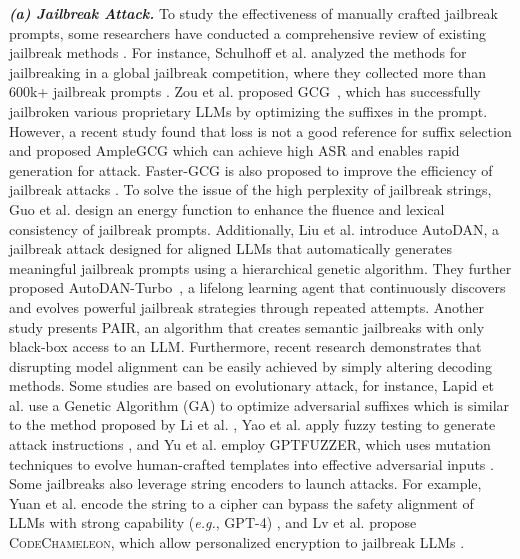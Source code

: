 \textbf{\textit{(a) Jailbreak Attack.}} To study the effectiveness of manually crafted jailbreak prompts, some researchers have conducted a comprehensive review of existing jailbreak methods \cite{schulhoff-etal-2023-ignore, yi2024jailbreakattacksdefenseslarge, sun2024iterative}. For instance, Schulhoff et al. analyzed the methods for jailbreaking in a global jailbreak competition, where they collected more than 600k+ jailbreak prompts \cite{schulhoff-etal-2023-ignore}. Zou et al. proposed GCG~\cite{zou2023universal}, which has successfully jailbroken various proprietary LLMs by optimizing the suffixes in the prompt. However, a recent study found that loss is not a good reference for suffix selection and proposed AmpleGCG \cite{liao2024amplegcglearninguniversaltransferable, kumar2024amplegcgplus} which can achieve high ASR and enables rapid generation for attack. Faster-GCG is also proposed to improve the efficiency of jailbreak attacks \cite{li2024faster}. To solve the issue of the high perplexity of jailbreak strings, Guo et al. \cite{guo2024coldattack} design an energy function to enhance the fluence and lexical consistency of jailbreak prompts. Additionally, Liu et al. \cite{liu2023autodan} introduce AutoDAN, a jailbreak attack designed for aligned LLMs that automatically generates meaningful jailbreak prompts using a hierarchical genetic algorithm. They further proposed AutoDAN-Turbo~\cite{liu2024autodan}, a lifelong learning agent that continuously discovers and evolves powerful jailbreak strategies through repeated attempts. Another study \cite{jailbreak20queries} presents PAIR, an algorithm that creates semantic jailbreaks with only black-box access to an LLM. Furthermore, recent research \cite{huang2023catastrophic} demonstrates that disrupting model alignment can be easily achieved by simply altering decoding methods. Some studies are based on evolutionary attack, for instance, Lapid et al. use a Genetic Algorithm (GA) to optimize adversarial suffixes \cite{lapid2023open} which is similar to the method proposed by Li et al. \cite{li2024semantic}, Yao et al. apply fuzzy testing to generate attack instructions \cite{fuzzllm}, and Yu et al. employ GPTFUZZER, which uses mutation techniques to evolve human-crafted templates into effective adversarial inputs \cite{gptfuzzer}. Some jailbreaks also leverage string encoders to launch attacks. For example, Yuan et al. encode the string to a cipher can bypass the safety alignment of LLMs with strong capability (\emph{e.g.}, GPT-4) \cite{cipher}, and Lv et al. propose \textsc{CodeChameleon}, which allow personalized encryption to jailbreak LLMs \cite{lv2024codechameleon}.

